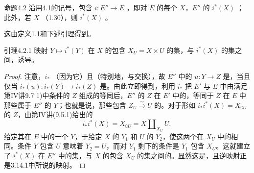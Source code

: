 \begin{SGAresult}{命题}{4.2}
沿用4.1的记号，包含 $i:E''\to E$ ，即对 $E$ 的每个 $X$，$E''$ 的 $i^*(X)$ ；此外，若 $X$ （1.30），则 $i^*(X)$ 。
\end{SGAresult}
这由定义1.1和下述引理得到。

\begin{SGAresult}{引理}{4.2.1}
映射 $Y\mapsto i^*(Y)$ 在 $X$ 的包含 $X_U=X\times U$ 的集，与 $i^*(X)$ 的集之间，诱导。
\end{SGAresult}
\begin{proof}
注意，$i_*$ （因为它）且（特别地，与交换），故 $E''$ 中的 $u:Y\to Z$ 是，当且仅当 $i_*(u):i_*(Y)\to i_*(Z)$ 是。由此立即得到，利用 $i_*$ 把 $E'$ 与 $E$ 中由满足第IV讲9.7 1)中条件的 $Z$ 组成的等同后，$E''$ 的 $Z$ 在 $E'$ 中的，等同于 $Z$ 在 $E$ 中那些属于 $E''$ 的 $Y$；也就是说，那些包含 $Z_U\xrightarrow{\sim}U$ 的。对于形如 $i_*i^*(X)=X_{\complement U}$ 的 $Z$，由第IV讲(9.5.1)给出的
\[
i_*i^*(X)=X_{\complement U}=X\amalg_{X_U}U,
\]
给定其在 $E$ 中的一个 $Y$，于给定 $X$ 的 $Y_1$ 和 $U$ 的 $Y_2$，使这两个在 $X_U$ 中的相同。条件 $Y$ 包含 $U$ 意味着 $Y_2=U$，而对 $Y_1$ 剩下的条件是 $Y_1$ 包含 $X_U$。这就建立了 $i^*(X)$ 在 $E''$ 中的集，与 $X$ 的包含 $X_U$ 的集之间的。显然这是，且逆映射正是3.14.1中所说的映射。
\end{proof}

